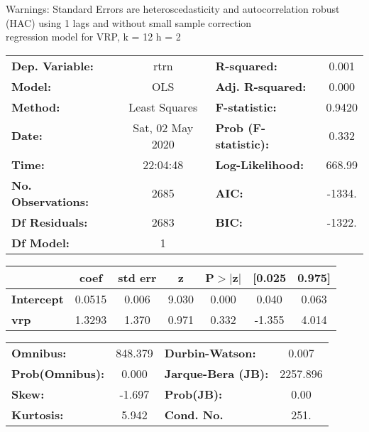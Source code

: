 Warnings: \newline
 [1] Standard Errors are heteroscedasticity and autocorrelation robust (HAC) using 1 lags and without small sample correction\\ 

regression model for VRP, k = 12 h = 2\begin{center}
\begin{tabular}{lclc}
\toprule
\textbf{Dep. Variable:}    &       rtrn       & \textbf{  R-squared:         } &     0.001   \\
\textbf{Model:}            &       OLS        & \textbf{  Adj. R-squared:    } &     0.000   \\
\textbf{Method:}           &  Least Squares   & \textbf{  F-statistic:       } &    0.9420   \\
\textbf{Date:}             & Sat, 02 May 2020 & \textbf{  Prob (F-statistic):} &    0.332    \\
\textbf{Time:}             &     22:04:48     & \textbf{  Log-Likelihood:    } &    668.99   \\
\textbf{No. Observations:} &        2685      & \textbf{  AIC:               } &    -1334.   \\
\textbf{Df Residuals:}     &        2683      & \textbf{  BIC:               } &    -1322.   \\
\textbf{Df Model:}         &           1      & \textbf{                     } &             \\
\bottomrule
\end{tabular}
\begin{tabular}{lcccccc}
                   & \textbf{coef} & \textbf{std err} & \textbf{z} & \textbf{P$> |$z$|$} & \textbf{[0.025} & \textbf{0.975]}  \\
\midrule
\textbf{Intercept} &       0.0515  &        0.006     &     9.030  &         0.000        &        0.040    &        0.063     \\
\textbf{vrp}       &       1.3293  &        1.370     &     0.971  &         0.332        &       -1.355    &        4.014     \\
\bottomrule
\end{tabular}
\begin{tabular}{lclc}
\textbf{Omnibus:}       & 848.379 & \textbf{  Durbin-Watson:     } &    0.007  \\
\textbf{Prob(Omnibus):} &   0.000 & \textbf{  Jarque-Bera (JB):  } & 2257.896  \\
\textbf{Skew:}          &  -1.697 & \textbf{  Prob(JB):          } &     0.00  \\
\textbf{Kurtosis:}      &   5.942 & \textbf{  Cond. No.          } &     251.  \\
\bottomrule
\end{tabular}
\end{center}


